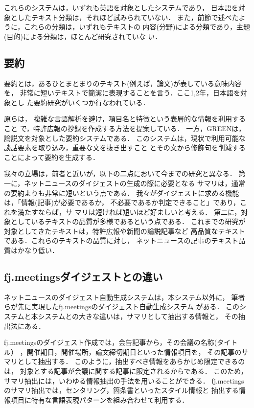 これらのシステムは，いずれも英語を対象としたシステムであり，
日本語を対象としたテキスト分類は，それほど試みられていない．
また，前節で述べたように，これらの分類は，いずれもテキストの
内容(分野)による分類であり，主題(目的)による分類は，ほとんど研究されていな
い．

\subsection{要約}

要約とは，あるひとまとまりのテキスト(例えば，論文)が表している意味内容を，
非常に短いテキストで簡潔に表現することを言う．ここ1,2年，日本語を対象とし
た要約研究がいくつか行なわれている．

原ら\cite{Hara-ipsj-nlp-94}は，
複雑な言語解析を避け，項目名と特徴という表層的な情報を利用すること
で，特許広報の抄録を作成する方法を提案している．
一方，GREEN\cite{Yamamoto-nlp-95}は，論説文を対象とした要約システムである．
このシステムは，現状で利用可能な談話要素を取り込み，重要な文を抜き出すこと
とその文から修飾句を削減することによって要約を生成する．

我々の立場は，前者と近いが，以下の二点において今までの研究と異なる．
第一に，ネットニュースのダイジェストの生成の際に必要となる
サマリは，通常の要約よりも非常に短いという点である．
我々がダイジェストに求める機能は，「情報(記事)が必要であるか，
不必要であるか判定できること」であり，これを満たすならば，サ
マリは短ければ短いほど好ましいと考える．
第二に，対象としているテキストの品質が多様であるという点である．
これまでの研究が対象としてきたテキストは，特許広報や新聞の論説記事など
高品質なテキストである．これらのテキストの品質に対し，
ネットニュースの記事のテキスト品質はかなり低い．

\subsection{fj.meetingsダイジェストとの違い}

ネットニュースのダイジェスト自動生成システムは，本システム以外に，
筆者らが先に実現したfj.meetingsのダイジェスト自動生成システム
\cite{Madoka-master-94,Madoka-ipsj-conf-94,Madoka-ipsj95}がある．
このシステムと本システムとの大きな違いは，サマリとして抽出する情報と，
その抽出法にある．

fj.meetingsのダイジェスト作成では，会告記事から，その会議の名称(タイトル）
，開催期日，開催場所，論文締切期日といった情報項目を，
その記事のサマリとして抽出する．
このように，抽出すべき情報をあらかじめ限定できるのは，
対象とする記事が会議に関する記事に限定されるからである．
このため，サマリ抽出には，いわゆる情報抽出の手法を用いることができる．
fj.meetingsのサマリ抽出では，センタリング，箇条書といったスタイル情報と
抽出する情報項目に特有な言語表現パターンを組み合わせて利用する．

